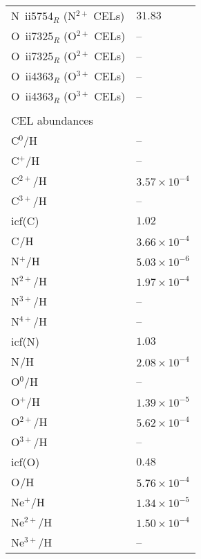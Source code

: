 \begin{longtable}[l]{ll}
 N~{\sc ii}5754$_R$ (N$^{2+}$ CELs)  & $ 31.83$\\
 O~{\sc ii}7325$_R$ (O$^{2+}$ CELs)  & -- \\
 O~{\sc ii}7325$_R$ (O$^{2+}$ CELs)  & -- \\
 O~{\sc ii}4363$_R$ (O$^{3+}$ CELs)  & -- \\
 O~{\sc ii}4363$_R$ (O$^{3+}$ CELs)  & -- \\
 \vspace{0.2cm}\\\multicolumn{2}{l}{CEL abundances}\\ \hline
 C$^{0}$/H                           & -- \\
 C$^{+}$/H                           & -- \\
 C$^{2+}$/H                          & $  3.57\times 10^{ -4}$\\
 C$^{3+}$/H                          & -- \\
 icf(C)                              & $  1.02$\\
 C$^{}$/H                            & $  3.66\times 10^{ -4}$\\
 N$^{+}$/H                           & $  5.03\times 10^{ -6}$\\
 N$^{2+}$/H                          & $  1.97\times 10^{ -4}$\\
 N$^{3+}$/H                          & -- \\
 N$^{4+}$/H                          & -- \\
 icf(N)                              & $  1.03$\\
 N$^{}$/H                            & $  2.08\times 10^{ -4}$\\
 O$^{0}$/H                           & -- \\
 O$^{+}$/H                           & $  1.39\times 10^{ -5}$\\
 O$^{2+}$/H                          & $  5.62\times 10^{ -4}$\\
 O$^{3+}$/H                          & -- \\
 icf(O)                              & $  0.48$\\
 O$^{}$/H                            & $  5.76\times 10^{ -4}$\\
 Ne$^{+}$/H                          & $  1.34\times 10^{ -5}$\\
 Ne$^{2+}$/H                         & $  1.50\times 10^{ -4}$\\
 Ne$^{3+}$/H                         & -- \\

\end{longtable}
